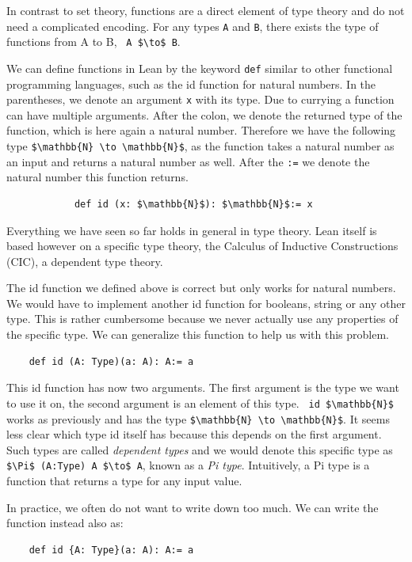 In contrast to set theory, functions are a direct element of type theory and do not need a complicated encoding. For any types \lstinline|A| and \lstinline|B|, there exists the type of functions from A to B, \lstinline| A $\to$ B|.

We can define functions in Lean by the keyword \lstinline|def| similar to other functional programming languages, such as the id function for natural numbers. In the parentheses, we denote an argument \lstinline|x| with its type. Due to currying a function can have multiple arguments. After the colon, we denote the returned type of the function, which is here again a natural number. Therefore we have the following type \lstinline|$\mathbb{N} \to \mathbb{N}$|, as the function takes a natural number as an input and returns a natural number as well. After the \lstinline|:=| we denote the natural number this function returns. 
\begin{lstlisting}
            def id (x: $\mathbb{N}$): $\mathbb{N}$:= x
\end{lstlisting}

Everything we have seen so far holds in general in type theory. Lean itself is based however on a specific type theory, the Calculus of Inductive Constructions (CIC), a dependent type theory\cite{Lean4, CoC}.

The id function we defined above is correct but only works for natural numbers. We would have to implement another id function for booleans, string or any other type. This is rather cumbersome because we never actually use any properties of the specific type. We can generalize this function to help us with this problem.

\begin{lstlisting}
    def id (A: Type)(a: A): A:= a
\end{lstlisting}

This id function has now two arguments. The first argument is the type we want to use it on, the second argument is an element of this type. \lstinline| id $\mathbb{N}$| works as previously and has the type \lstinline|$\mathbb{N} \to \mathbb{N}$|. It seems less clear which type id itself has because this depends on the first argument.
Such types are called \textit{dependent types} and we would denote this specific type as \lstinline|$\Pi$ (A:Type) A $\to$ A|, known as a \textit{Pi type}. Intuitively, a Pi type is a function that returns a type for any input value.

In practice, we often do not want to write down too much. We can write the function instead also as:
\begin{lstlisting}
    def id {A: Type}(a: A): A:= a
\end{lstlisting}

